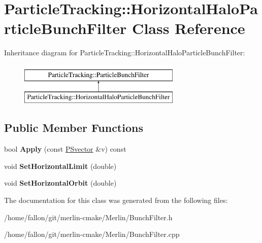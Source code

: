 \hypertarget{classParticleTracking_1_1HorizontalHaloParticleBunchFilter}{}\section{Particle\+Tracking\+:\+:Horizontal\+Halo\+Particle\+Bunch\+Filter Class Reference}
\label{classParticleTracking_1_1HorizontalHaloParticleBunchFilter}
Inheritance diagram for Particle\+Tracking\+:\+:Horizontal\+Halo\+Particle\+Bunch\+Filter\+:\begin{figure}[H]
\begin{center}
\leavevmode
\includegraphics[height=2.000000cm]{classParticleTracking_1_1HorizontalHaloParticleBunchFilter}
\end{center}
\end{figure}
\subsection*{Public Member Functions}
\begin{DoxyCompactItemize}
\item 
\mbox{\label{classParticleTracking_1_1HorizontalHaloParticleBunchFilter_a6a3d6ed5c884ffb251b68a3b3f9a08c6}} 
bool {\bfseries Apply} (const \hyperlink{classPSvector}{P\+Svector} \&v) const
\item 
\mbox{\label{classParticleTracking_1_1HorizontalHaloParticleBunchFilter_afef57c0a8a48491c0fb6f08810392656}} 
void {\bfseries Set\+Horizontal\+Limit} (double)
\item 
\mbox{\label{classParticleTracking_1_1HorizontalHaloParticleBunchFilter_a5b1c09609921f8d06a7b501e26a2bf0e}} 
void {\bfseries Set\+Horizontal\+Orbit} (double)
\end{DoxyCompactItemize}


The documentation for this class was generated from the following files\+:\begin{DoxyCompactItemize}
\item 
/home/fallon/git/merlin-\/cmake/\+Merlin/Bunch\+Filter.\+h\item 
/home/fallon/git/merlin-\/cmake/\+Merlin/Bunch\+Filter.\+cpp\end{DoxyCompactItemize}
